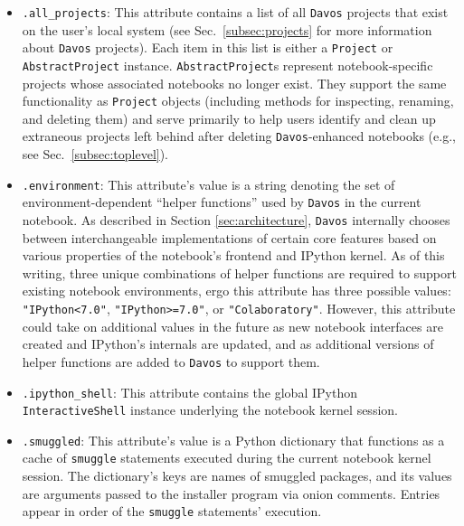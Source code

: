\documentclass[preprint,12pt,a4paper]{elsarticle}
\begin{document}
\begin{itemize}

\item \texttt{.all\_projects}: This attribute contains a list of all \texttt{Davos} projects that exist on the user's local system (see Sec.~\ref{subsec:projects} for more information about \texttt{Davos} projects).
  Each item in this list is either a \texttt{Project} or \texttt{AbstractProject} instance.
  \texttt{Abstract\-Project}s represent notebook-specific projects whose associated notebooks no longer exist.
  They support the same functionality as \texttt{Project} objects (including methods for inspecting, renaming, and deleting them) and serve primarily to help users identify and clean up extraneous projects left behind after deleting \texttt{Davos}-enhanced notebooks (e.g., see Sec.~\ref{subsec:toplevel}).

\item \texttt{.environment}: This attribute's value is a string denoting the set of environment-dependent ``helper functions'' used by \texttt{Davos} in the current notebook.
  As described in Section \ref{sec:architecture}, \texttt{Davos} internally chooses between interchangeable implementations of certain core features based on various properties of the notebook's frontend and IPython kernel.
  As of this writing, three unique combinations of helper functions are required to support existing notebook environments, ergo this attribute has three possible values: \texttt{"IPython<7.0"}, \texttt{"IPython>=7.0"}, or \texttt{"Colaboratory"}.
  However, this attribute could take on additional values in the future as new notebook interfaces are created and IPython's internals are updated, and as additional versions of helper functions are added to \texttt{Davos} to support them.

\item \texttt{.ipython\_shell}: This attribute contains the global IPython \texttt{InteractiveShell} instance underlying the notebook kernel session.

\item \texttt{.smuggled}: This attribute's value is a Python dictionary that functions as a cache of \texttt{smuggle} statements executed during the current notebook kernel session.
  The dictionary's keys are names of smuggled packages, and its values are arguments passed to the installer program via onion comments.
  Entries appear in order of the \texttt{smuggle} statements' execution.

\end{itemize}
\end{document}
